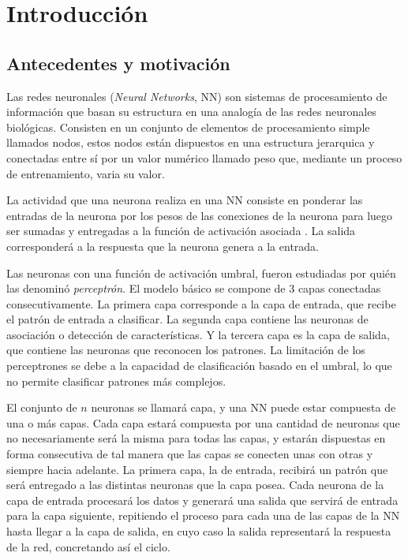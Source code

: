 \chapter{Introducción}
\section{Antecedentes y motivación}
Las redes neuronales ({\em Neural Networks}, NN) son sistemas de procesamiento de información que basan su estructura en una analogía de las redes neuronales biológicas. Consisten en un conjunto de elementos de procesamiento simple llamados nodos, estos nodos están dispuestos en una estructura jerarquica y conectadas entre sí por un valor numérico llamado peso que, mediante un proceso de entrenamiento, varia su valor.

La actividad que una neurona realiza en una NN consiste en ponderar las entradas de la neurona por los pesos de las conexiones de la neurona para luego ser sumadas y entregadas a la función de activación asociada \cite{McCulloch1943}. La salida corresponderá a la respuesta que la neurona genera a la entrada.

Las neuronas con una función de activación umbral, fueron estudiadas por  quién las denominó {\em perceptrón}. El modelo básico se compone de 3 capas conectadas consecutivamente. La primera capa corresponde a la capa de entrada, que recibe el patrón de entrada a clasificar. La segunda capa contiene las neuronas de asociación o detección de características. Y la tercera capa es la capa de salida, que contiene las neuronas que reconocen los patrones. La limitación de los perceptrones se debe a la capacidad de clasificación basado en el umbral, lo que no permite clasificar patrones más complejos.

El conjunto de $n$ neuronas se llamará capa, y una NN puede estar compuesta de una o más capas. Cada capa estará compuesta por una cantidad de neuronas que no necesariamente será la misma para todas las capas, y estarán dispuestas en forma consecutiva de tal manera que las capas se conecten unas con otras y siempre hacia adelante. La primera capa, la de entrada, recibirá un patrón que será entregado a las distintas neuronas que la capa posea. Cada neurona de la capa de entrada procesará los datos y generará una salida que servirá de entrada para la capa siguiente, repitiendo el proceso para cada una de las capas de la NN hasta llegar a la capa de salida, en cuyo caso la salida representará la respuesta de la red, concretando así el ciclo.


